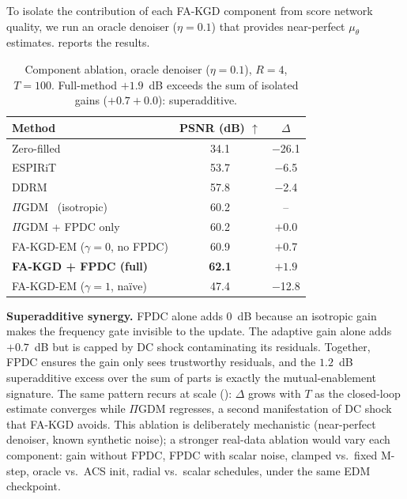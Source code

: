 \documentclass[10pt,twocolumn,letterpaper]{article}
\newcommand{\muth}{\mu_\theta}
\newcommand{\PIGDM}{$\Pi$GDM}
\begin{document}
To isolate the contribution of each FA-KGD component from score network
quality, we run an oracle denoiser ($\eta=0.1$) that provides near-perfect
$\muth$ estimates.  reports the results.

\begin{table}[H]
\centering
\caption{Component ablation, oracle denoiser ($\eta{=}0.1$), $R{=}4$,
$T{=}100$. Full-method $+1.9$~dB exceeds the sum of isolated gains
($+0.7+0.0$): superadditive.}
\label{tab:ablation}
\small
\setlength{\tabcolsep}{3pt}
\begin{tabular}{lcc}
\toprule
\textbf{Method} & \textbf{PSNR (dB) $\uparrow$} & \textbf{$\Delta$} \\
\midrule
Zero-filled & 34.1 & $-$26.1 \\
ESPIRiT~\cite{uecker2014espirit} & 53.7 & $-$6.5 \\
DDRM~\cite{kawar2022ddrm} & 57.8 & $-$2.4 \\
\PIGDM{}~\cite{song2023pigdm} (isotropic) & 60.2 & -- \\
\midrule
\PIGDM{} + FPDC only & 60.2 & $+$0.0 \\
FA-KGD-EM ($\gamma{=}0$, no FPDC) & 60.9 & $+$0.7 \\
\textbf{FA-KGD + FPDC (full)} & \textbf{62.1} & $\mathbf{+1.9}$ \\
\midrule
FA-KGD-EM ($\gamma{=}1$, na\"{i}ve) & 47.4 & $-$12.8 \\
\bottomrule
\end{tabular}
\end{table}

\textbf{Superadditive synergy.} FPDC alone adds $0$~dB because an isotropic
gain makes the frequency gate invisible to the update. The adaptive gain
alone adds $+0.7$~dB but is capped by DC shock contaminating its residuals.
Together, FPDC ensures the gain only sees trustworthy residuals, and the
$1.2$~dB superadditive excess over the sum of parts is exactly the
mutual-enablement signature. The same pattern recurs at scale
(): $\Delta$ grows with $T$ as the closed-loop estimate
converges while \PIGDM{} regresses, a second manifestation of DC shock that
FA-KGD avoids.
This ablation is deliberately mechanistic (near-perfect denoiser, known
synthetic noise); a stronger real-data ablation would vary each component:
gain without FPDC, FPDC with scalar noise, clamped vs.\ fixed M-step, oracle
vs.\ ACS init, radial vs.\ scalar schedules, under the same EDM checkpoint.

\end{document}
